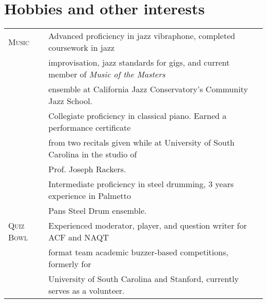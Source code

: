 \documentclass[a4paper,10pt]{article}
\begin{document}
\section{Hobbies and other interests}
\begin{tabular}{ll}
 \textsc{Music} & Advanced proficiency in jazz vibraphone, completed coursework in jazz \\
 & improvisation, jazz standards for gigs, and current member of \textit{Music of the Masters}\\
 & ensemble at California Jazz Conservatory's Community Jazz School.\vspace{0.05in}\\
 & Collegiate proficiency in classical piano.  Earned a performance certificate\\
 & from two recitals given while at University of South Carolina in the studio of\\
 & Prof. Joseph Rackers.\vspace{0.05in}\\
 & Intermediate proficiency in steel drumming, 3 years experience in Palmetto \\
 & Pans Steel Drum ensemble. \vspace{0.05in}\\
  \textsc{Quiz Bowl} & Experienced moderator, player, and question writer for ACF and NAQT \\
 & format team academic buzzer-based competitions, formerly for \\
 & University of South Carolina and Stanford, currently serves as a volunteer.
\end{tabular}
\nocite{*}
\end{document}
